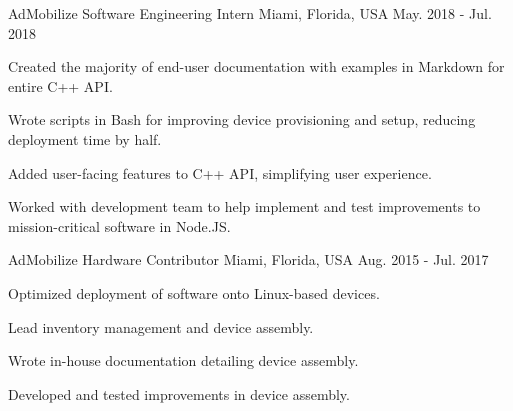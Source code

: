 \begin{cventries}

  \cventry
    {AdMobilize} %
    {Software Engineering Intern} %
    {Miami, Florida, USA} %
    {May. 2018 - Jul. 2018} %
    {
      \begin{cvitems} %
        \item {Created the majority of end-user documentation with examples in Markdown for entire C++ API.}
        \item {Wrote scripts in Bash for improving device provisioning and setup, reducing deployment time by half.}
        \item {Added user-facing features to C++ API, simplifying user experience.}
        \item {Worked with development team to help implement and test improvements to mission-critical software in Node.JS.}
      \end{cvitems}
    }

  \cventry
    {AdMobilize} %
    {Hardware Contributor} %
    {Miami, Florida, USA} %
    {Aug. 2015 - Jul. 2017} %
    {
      \begin{cvitems} %
        \item {Optimized deployment of software onto Linux-based devices.}
        \item {Lead inventory management and device assembly.}
        \item {Wrote in-house documentation detailing device assembly.}
        \item {Developed and tested improvements in device assembly.}
      \end{cvitems}
    }

\end{cventries}
